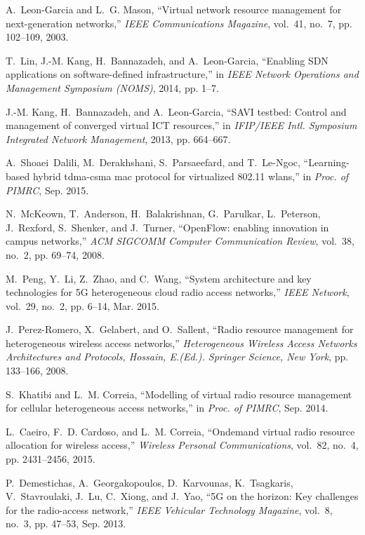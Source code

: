 \documentclass[conference]{IEEEtran}
\begin{document}
\begin{thebibliography}{10}
	A.~Leon-Garcia and L.~G. Mason, ``Virtual network resource management for
	next-generation networks,'' \emph{IEEE Communications Magazine}, vol.~41,
	no.~7, pp. 102--109, 2003.
	
	T.~Lin, J.-M. Kang, H.~Bannazadeh, and A.~Leon-Garcia, ``Enabling {SDN}
	applications on software-defined infrastructure,'' in \emph{IEEE Network
		Operations and Management Symposium (NOMS)}, 2014, pp. 1--7.
	
	J.-M. Kang, H.~Bannazadeh, and A.~Leon-Garcia, ``{SAVI} testbed: Control and
	management of converged virtual {ICT} resources,'' in \emph{IFIP/IEEE Intl.
		Symposium Integrated Network Management}, 2013, pp. 664--667.
	
	A.~Shoaei~Dalili, M.~Derakhshani, S.~Parsaeefard, and T.~Le-Ngoc,
	``Learning-based hybrid tdma-csma mac protocol for virtualized 802.11
	wlans,'' in \emph{Proc. of PIMRC}, Sep. 2015.
	
	N.~McKeown, T.~Anderson, H.~Balakrishnan, G.~Parulkar, L.~Peterson, J.~Rexford,
	S.~Shenker, and J.~Turner, ``Open{F}low: enabling innovation in campus
	networks,'' \emph{ACM SIGCOMM Computer Communication Review}, vol.~38, no.~2,
	pp. 69--74, 2008.
	
	M.~Peng, Y.~Li, Z.~Zhao, and C.~Wang, ``System architecture and key
	technologies for {5G} heterogeneous cloud radio access networks,'' \emph{IEEE
		Network}, vol.~29, no.~2, pp. 6--14, Mar. 2015.
	
	J.~Perez-Romero, X.~Gelabert, and O.~Sallent, ``Radio resource management for
	heterogeneous wireless access networks,'' \emph{Heterogeneous Wireless Access
		Networks Architectures and Protocols, Hossain, E.(Ed.). Springer Science, New
		York}, pp. 133--166, 2008.
	
	S.~Khatibi and L.~M. Correia, ``Modelling of virtual radio resource management
	for cellular heterogeneous access networks,'' in \emph{Proc. of PIMRC}, Sep.
	2014.
	
	L.~Caeiro, F.~D. Cardoso, and L.~M. Correia, ``Ondemand virtual radio resource
	allocation for wireless access,'' \emph{Wireless Personal Communications},
	vol.~82, no.~4, pp. 2431--2456, 2015.
	
	P.~Demestichas, A.~Georgakopoulos, D.~Karvounas, K.~Tsagkaris, V.~Stavroulaki,
	J.~Lu, C.~Xiong, and J.~Yao, ``{5G} on the horizon: Key challenges for the
	radio-access network,'' \emph{IEEE Vehicular Technology Magazine}, vol.~8,
	no.~3, pp. 47--53, Sep. 2013.
	

\end{thebibliography}
\end{document}
